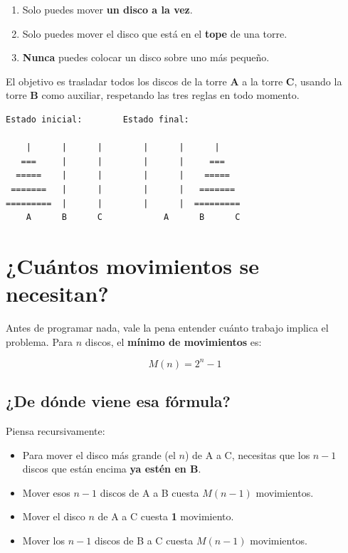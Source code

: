 \documentclass[12pt, oneside]{article}
\begin{document}
\begin{enumerate}
  \item Solo puedes mover \textbf{un disco a la vez}.
  \item Solo puedes mover el disco que está en el \textbf{tope} de una torre.
  \item \textbf{Nunca} puedes colocar un disco sobre uno más pequeño.
\end{enumerate}

El objetivo es trasladar todos los discos de la torre \textbf{A} a la torre
\textbf{C}, usando la torre \textbf{B} como auxiliar, respetando las tres
reglas en todo momento.

\begin{verbatim}
Estado inicial:        Estado final:

    |      |      |        |      |      |
   ===     |      |        |      |     ===
  =====    |      |        |      |    =====
 =======   |      |        |      |   =======
=========  |      |        |      |  =========
    A      B      C            A      B      C
\end{verbatim}

\section{¿Cuántos movimientos se necesitan?}

Antes de programar nada, vale la pena entender cuánto trabajo implica el
problema.  Para $n$ discos, el \textbf{mínimo de movimientos} es:

\[
  M(n) = 2^n - 1
\]

\subsection{¿De dónde viene esa fórmula?}

Piensa recursivamente:

\begin{itemize}
  \item Para mover el disco más grande (el $n$) de A a C, necesitas
        que los $n-1$ discos que están encima \textbf{ya estén en B}.
  \item Mover esos $n-1$ discos de A a B cuesta $M(n-1)$ movimientos.
  \item Mover el disco $n$ de A a C cuesta \textbf{1} movimiento.
  \item Mover los $n-1$ discos de B a C cuesta $M(n-1)$ movimientos.
\end{itemize}
\end{document}
